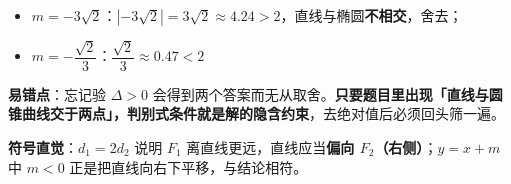 \begin{answer}
\begin{itemize}
\item $m=-3\sqrt2$：$\left|-3\sqrt2\right|=3\sqrt2\approx4.24>2$，直线与椭圆\textbf{不相交}，舍去；
\item $m=-\dfrac{\sqrt2}3$：$\dfrac{\sqrt2}3\approx0.47<2$ 
\end{itemize}

\begin{gktip}
\textbf{易错点}：忘记验 $\Delta>0$ 会得到两个答案而无从取舍。\textbf{只要题目里出现「直线与圆锥曲线交于两点」，判别式条件就是解的隐含约束}，去绝对值后必须回头筛一遍。

\textbf{符号直觉}：$d_1=2d_2$ 说明 $F_1$ 离直线更远，直线应当\textbf{偏向 $F_2$（右侧）}；$y=x+m$ 中 $m<0$ 正是把直线向右下平移，与结论相符。
\end{gktip}


\par\medskip

\end{answer}
